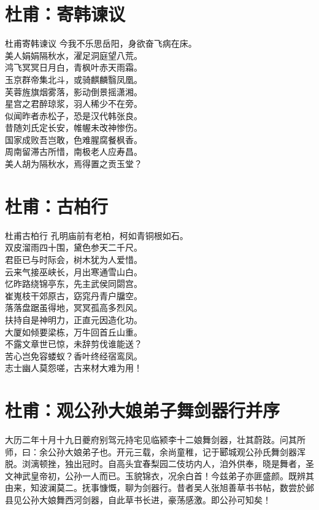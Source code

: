 \documentclass[12pt,oneside,a5paper]{book}
\begin{document}
\chapter{杜甫：寄韩谏议}
\begin{poemzh}{杜甫}{寄韩谏议}
今我不乐思岳阳，身欲奋飞病在床。\\
美人娟娟隔秋水，濯足洞庭望八荒。\\
鸿飞冥冥日月白，青枫叶赤天雨霜。\\
玉京群帝集北斗，或骑麒麟翳凤凰。\\
芙蓉旌旗烟雾落，影动倒景摇潇湘。\\
星宫之君醉琼浆，羽人稀少不在旁。\\
似闻昨者赤松子，恐是汉代韩张良。\\
昔随刘氏定长安，帷幄未改神惨伤。\\
国家成败吾岂敢，色难腥腐餐枫香。\\
周南留滞古所惜，南极老人应寿昌。\\
美人胡为隔秋水，焉得置之贡玉堂？\\ 
\end{poemzh}

\chapter{杜甫：古柏行}
\begin{poemzh}{杜甫}{古柏行}
孔明庙前有老柏，柯如青铜根如石。\\
双皮溜雨四十围，黛色参天二千尺。\\
君臣已与时际会，树木犹为人爱惜。\\
云来气接巫峡长，月出寒通雪山白。\\
忆昨路绕锦亭东，先主武侯同閟宫。\\
崔嵬枝干郊原古，窈窕丹青户牖空。\\
落落盘踞虽得地，冥冥孤高多烈风。\\
扶持自是神明力，正直元因造化功。\\
大厦如倾要梁栋，万牛回首丘山重。\\
不露文章世已惊，未辞剪伐谁能送？\\
苦心岂免容蝼蚁？香叶终经宿鸾凤。\\
志士幽人莫怨嗟，古来材大难为用！\\ 
\end{poemzh}

\chapter{杜甫：观公孙大娘弟子舞剑器行并序}
大历二年十月十九日夔府别驾元持宅见临颍李十二娘舞剑器，壮其蔚跂。问其所师，曰：余公孙大娘弟子也。开元三载，余尚童稚，记于郾城观公孙氏舞剑器浑脱。浏漓顿挫，独出冠时。自高头宜春梨园二伎坊内人，洎外供奉，晓是舞者，圣文神武皇帝初，公孙一人而已。玉貌锦衣，况余白首！今兹弟子亦匪盛颜。既辨其由来，知波澜莫二。抚事慷慨，聊为剑器行。昔者吴人张旭善草书书帖，数尝於邺县见公孙大娘舞西河剑器，自此草书长进，豪荡感激。即公孙可知矣！
\end{document}
